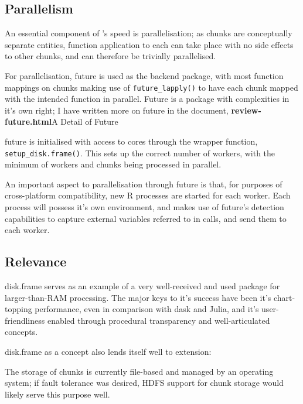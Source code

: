\hypertarget{sec:parallelisation}{
    \subsection{Parallelism}\label{sec:parallelisation}}

An essential component of 's speed is parallelisation; as
chunks are conceptually separate entities, function application to each
can take place with no side effects to other chunks, and can therefore
be trivially parallelised.

For parallelisation, future is used as the backend package, with most
function mappings on chunks making use of \texttt{future_lapply()}
to have each chunk mapped with the intended function in parallel. Future
is a package with complexities in it's own right; I have written more on
future in the document, \textbf{review-future.html}{A Detail of Future}

future is initialised with access to cores through the wrapper function,
\texttt{setup_disk.frame()}\cite{zj19:_key}.
This sets up the correct number of workers, with the minimum of workers
and chunks being processed in parallel.

An important aspect to parallelisation through future is that, for
purposes of cross-platform compatibility, new R processes are started
for each worker\cite{zj19:_using}. Each process will possess it's own
environment, and  makes use of future's detection capabilities
to capture external variables referred to in calls, and send them to
each worker.

\hypertarget{sec:relevance}{%
    \subsection{Relevance}\label{sec:relevance}}

disk.frame serves as an example of a very well-received and used package
for larger-than-RAM processing. The major keys to it's success have been
it's chart-topping performance, even in comparison with dask and Julia,
and it's user-friendliness enabled through procedural transparency and
well-articulated concepts.

disk.frame as a concept also lends itself well to extension:

The storage of chunks is currently file-based and managed by an
operating system; if fault tolerance was desired, HDFS support for chunk
storage would likely serve this purpose well.

